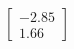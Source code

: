 \documentclass[preview]{standalone}
\begin{document}
\begin{align*}
\begin{bmatrix} -2.85 \\ 1.66 \end{bmatrix}
\end{align*}
\end{document}
